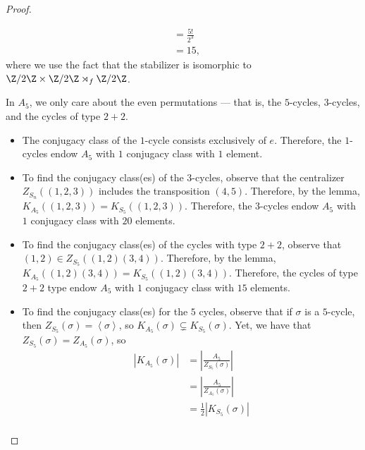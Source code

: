 \documentclass[10pt]{mypackage}
\begin{document}
\begin{proof}
\begin{itemize}
\begin{align*}
                                                                                          &= \frac{5!}{2^3}\\
                                                                                          &= 15,
      \end{align*}
      where we use the fact that the stabilizer is isomorphic to $\Z/2\Z\times \Z/2\Z\rtimes_{f} \Z/2\Z$.
  \end{itemize}
  In $A_5$, we only care about the even permutations --- that is, the $5$-cycles, $3$-cycles, and the cycles of type $2+2$. 
  \begin{itemize}
    \item The conjugacy class of the $1$-cycle consists exclusively of $e$. Therefore, the $1$-cycles endow $A_5$ with $1$ conjugacy class with $1$ element.
    \item To find the conjugacy class(es) of the $3$-cycles, observe that the centralizer $Z_{S_n}\left( \left( 1,2,3 \right) \right)$ includes the transposition $\left( 4,5 \right)$. Therefore, by the lemma, $K_{A_5}\left( \left( 1,2,3 \right) \right) = K_{S_5}\left( \left( 1,2,3 \right) \right)$. Therefore, the $3$-cycles endow $A_5$ with $1$ conjugacy class with $20$ elements.
    \item To find the conjugacy class(es) of the cycles with type $2+2$, observe that $\left( 1,2 \right)\in Z_{S_5}\left( \left( 1,2 \right)\left( 3,4 \right) \right)$. Therefore, by the lemma, $K_{A_5}\left( \left( 1,2 \right)\left( 3,4 \right) \right) = K_{S_5}\left( \left( 1,2 \right)\left( 3,4 \right) \right)$. Therefore, the cycles of type $2+2$ type endow $A_5$ with $1$ conjugacy class with $15$ elements.
    \item To find the conjugacy class(es) for the $5$ cycles, observe that if $\sigma$ is a $5$-cycle, then $Z_{S_5}\left( \sigma \right) = \left\langle \sigma \right\rangle$, so $K_{A_5}\left( \sigma \right)\subsetneq K_{S_5}\left( \sigma \right)$. Yet, we have that $Z_{S_5}\left( \sigma \right) = Z_{A_5}\left( \sigma \right)$, so
      \begin{align*}
        \left\vert K_{A_5}\left( \sigma \right) \right\vert &= \left\vert \frac{A_5}{Z_{S_5}\left( \sigma \right)} \right\vert\\
                                                            &= \left\vert \frac{A_5}{Z_{A_5}\left( \sigma \right)} \right\vert\\
                                                            &= \frac{1}{2}\left\vert K_{S_5}\left( \sigma \right) \right\vert\\

\end{align*}
\end{itemize}
\end{proof}
\end{document}
